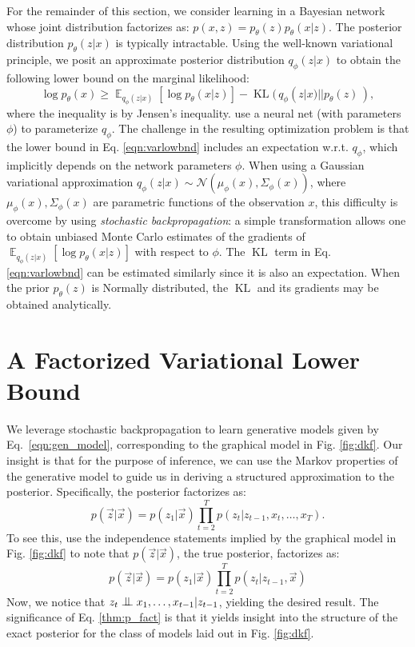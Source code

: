 \documentclass[letterpaper]{article}
\newcommand{\Exp}[2]{\mathop{\mathbb{E}}_{#2}\left[#1\right]}
\DeclareMathOperator{\KL}{KL}
\newcommand{\pth}{p_\theta}
\newcommand{\qph}{q_\phi}
\newcommand{\vecx}{\vec{x}}
\newcommand{\vecz}{\vec{z}}
\newcommand{\bigCI}{\mathrel{\text{\scalebox{1.07}{$\perp\mkern-10mu\perp$}}}}
\theoremstyle{plain}
\begin{document}
For the remainder of this section, we consider learning in a Bayesian network whose joint distribution factorizes as:
$p(x,z) = \pth(z) \pth(x|z)$. 
The posterior distribution $\pth(z|x)$ is typically intractable. Using the well-known 
variational principle, we posit an approximate posterior distribution $\qph(z|x)$ to
obtain the following lower bound on the marginal likelihood:
\begin{equation}\label{eqn:varlowbnd}
 \log \pth(x) \geq \Exp{\log \pth(x|z)}{\qph(z|x)} - \KL(\, \qph(z|x) || \pth(z)\, ),
\end{equation}
where the inequality is by Jensen's inequality. 
\citeauthor{kingma2013auto,rezende2014stochastic} use a neural net (with parameters $\phi$) to parameterize $\qph$.
The challenge in the resulting optimization problem is that the lower bound in Eq. \ref{eqn:varlowbnd} includes an expectation w.r.t. $\qph$, which implicitly depends on the network parameters $\phi$. 
When using a Gaussian variational approximation 
$\qph(z|x) \sim \mathcal{N}\left(\mu_\phi(x),\Sigma_\phi(x)\right)$, 
where $\mu_\phi(x),\Sigma_\phi(x)$ are parametric functions of the
observation $x$, this difficulty is overcome by using \emph{stochastic backpropagation}:
a simple transformation allows 
one to obtain unbiased Monte Carlo estimates of the gradients of $\Exp{\log \pth(x|z)}{\qph(z|x)} $ with respect to $\phi$.
The $\KL$ term in Eq. \ref{eqn:varlowbnd} can be estimated similarly since it is also an expectation. 
When the prior $\pth(z)$ is Normally distributed, the $\KL$ and its gradients 
may be obtained analytically.
 \section{A Factorized Variational Lower Bound \label{sec:learnmodel}}

We leverage stochastic backpropagation to learn generative models given by 
Eq.~\ref{eqn:gen_model}, corresponding to the graphical model in Fig. \ref{fig:dkf}.
Our insight is that for the purpose of inference, we can use the Markov properties of
the generative model to guide us in deriving a structured
approximation to the posterior. Specifically, the posterior factorizes as:
\begin{equation}
	\label{thm:p_fact}
	p(\vecz|\vecx) = p(z_1|\vecx)\prod_{t=2}^T p(z_t|z_{t-1},x_t,\ldots,x_T).
\end{equation}
To see this, use the independence statements implied by the graphical
model in Fig. \ref{fig:dkf}
 to note that $p(\vecz|\vecx)$, the true posterior, factorizes as:
	\begin{equation*} p(\vecz|\vecx) =
          p(z_1|\vecx)\prod_{t=2}^T
          p(z_t|z_{t-1},\vecx) 
\end{equation*}
Now, we notice that $z_t\bigCI x_1,\ldots,x_{t-1}|z_{t-1}$, yielding the desired result.
The significance of Eq. \ref{thm:p_fact} is that it yields 
insight into the structure of the exact posterior for the class of models
laid out in Fig. \ref{fig:dkf}. 
\end{document}
